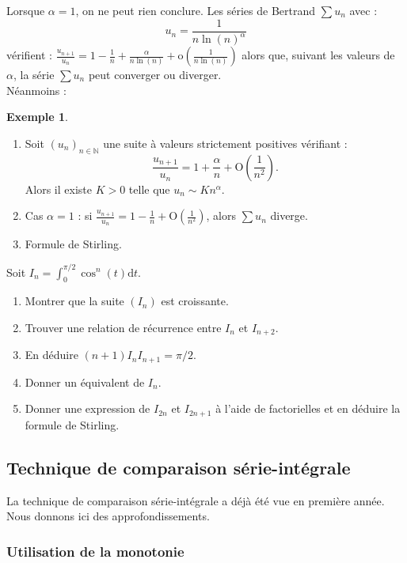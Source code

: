 \documentclass[french]{article}
\newcommand{\N}{\mathbb{N}}
\renewcommand{\o}{\text{o}}
\renewcommand{\O}{\text{O}}
\renewcommand{\d}{\text{d}}
\theoremstyle{plain}
\theoremstyle{definition}
\newtheorem*{ex}{Exemple}
\theoremstyle{remark}
\begin{document}
Lorsque $\alpha=1$, on ne peut rien conclure. Les séries de Bertrand $\displaystyle\sum u_n$ avec : $$u_n=\frac{1}{n\ln(n)^\alpha}$$ vérifient : $\displaystyle\frac{u_{n+1}}{u_n}=1-\frac{1}{n}+\frac{\alpha}{n\ln(n)}+\o\left(\frac{1}{n\ln(n)}\right)$ alors que, suivant les valeurs de $\alpha$, la série $\displaystyle\sum u_n$ peut converger ou diverger. \\

Néanmoins : 
\begin{ex}
	\begin{enumerate}
		\item Soit $(u_n)_{n\in\N}$ une suite à valeurs strictement positives vérifiant : $$\frac{u_{n+1}}{u_n}=1+\frac{\alpha}{n}+\O\left(\frac{1}{n^2}\right).$$ Alors il existe $K>0$ telle que $u_n\sim Kn^\alpha$.
		\item Cas $\alpha=1$ : si $\displaystyle\frac{u_{n+1}}{u_n}=1-\frac{1}{n}+\O\left(\frac{1}{n^2}\right)$, alors $\displaystyle\sum u_n$ diverge.
		\item Formule de Stirling.
	\end{enumerate}
\end{ex}

\begin{exo}
	Soit $I_n=\displaystyle\int_{0}^{\pi/2}\cos^n(t)\d t$.
	\begin{enumerate}
		\item Montrer que la suite $(I_n)$ est croissante.
		\item Trouver une relation de récurrence entre $I_n$ et $I_{n+2}$.
		\item En déduire $(n+1)I_nI_{n+1}=\pi/2$.
		\item Donner un équivalent de $I_n$.
		\item Donner une expression de $I_{2n}$ et $I_{2n+1}$ à l'aide de factorielles et en déduire la formule de Stirling.
	\end{enumerate}
\end{exo}

\subsection{Technique de comparaison série-intégrale}

La technique de comparaison série-intégrale a déjà été vue en première année. Nous donnons ici des approfondissements.

\subsubsection*{Utilisation de la monotonie}
\end{document}
